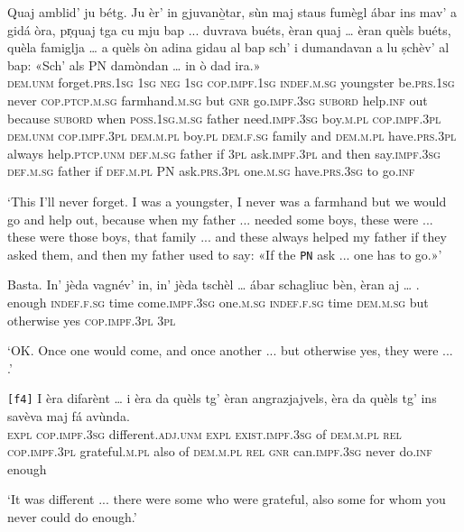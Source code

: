 \begin{linenumbers}
	\gll Quaj amblid’ ju bétg. Ju èr’ in gjuvanò̱tar, sùn maj staus fumègl ábar ins mav’ a gidá òra, pr̩quaj tga cu mju bap ... duvrava buéts, èran quaj … èran quèls buéts, quèla famiglja … a quèls òn adina gidau al bap sch’ i dumandavan a lu ṣchèv’ al bap: «Sch’ als \textsc{PN} damòndan … in ò dad ira.»\\
	\textsc{dem.unm} forget.\textsc{prs.1sg} \textsc{1sg} \textsc{neg} \textsc{1sg} \textsc{cop.impf.1sg} \textsc{indef.m.sg} youngster be.\textsc{prs.1sg} never \textsc{cop.ptcp.m.sg} farmhand.\textsc{m.sg} but \textsc{gnr} go.\textsc{impf.3sg} \textsc{subord} help.\textsc{inf} out because \textsc{subord} when \textsc{poss.1sg.m.sg} father {} need.\textsc{impf.3sg} boy.\textsc{m.pl} \textsc{cop.impf.3pl} \textsc{dem.unm} {} \textsc{cop.impf.3pl} \textsc{dem.m.pl} boy.\textsc{pl} \textsc{dem.f.sg} family {} and \textsc{dem.m.pl} have.\textsc{prs.3pl} always help.\textsc{ptcp.unm} \textsc{def.m.sg} father if \textsc{3pl} ask.\textsc{impf.3pl} and then say.\textsc{impf.3sg} \textsc{def.m.sg} father if \textsc{def.m.pl} \textsc{PN} ask.\textsc{prs.3pl} {} one.\textsc{m.sg} have.\textsc{prs.3sg} to go.\textsc{inf}\\
\end{linenumbers}
\medskip
\glt `This I'll never forget. I was a youngster, I never was a farmhand but we would go and help out, because when my father ... needed some boys, these were ... these were those boys, that family ... and these always helped my father if they asked them, and then my father used to say: «If the \texttt{PN} ask ... one has to go.»'
\medskip

\begin{linenumbers}
	\gll Basta. In' jèda vagnév’ in, in' jèda tschèl … ábar schagliuc bèn, èran aj … .   \\
	enough \textsc{indef.f.sg} time come.\textsc{impf.3sg} one.\textsc{m.sg} \textsc{indef.f.sg} time \textsc{dem.m.sg} {} but otherwise yes \textsc{cop.impf.3pl} \textsc{3pl}\\
\end{linenumbers}
\medskip
\glt `OK. Once one would come, and once another ... but otherwise yes, they were ... .'
\medskip

\begin{linenumbers}
	\gll \texttt{[f4]} I èra difarènt … i èra da quèls tg’ èran angrazjajvels, èra da quèls tg’ ins savèva maj fá avùnda.   \\
{} \textsc{expl} \textsc{cop.impf.3sg} different.\textsc{adj.unm} {} \textsc{expl} \textsc{exist.impf.3sg} of \textsc{dem.m.pl} \textsc{rel} \textsc{cop.impf.3pl} grateful.\textsc{m.pl} also of \textsc{dem.m.pl} \textsc{rel} \textsc{gnr} can.\textsc{impf.3sg} never do.\textsc{inf} enough\\
\end{linenumbers}
\medskip
\glt `It was different ... there were some who were grateful, also some for whom you never could do enough.'
\medskip

